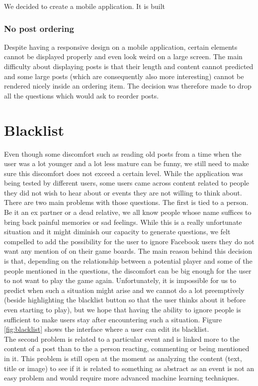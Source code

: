 We decided to create a mobile application. It is built


\subsubsection{No post ordering}
Despite having a responsive design on a mobile application, certain elements cannot be displayed properly and even look weird on a large screen. The main difficulty about displaying posts is that their length and content cannot predicted and some large posts (which are consequently also more interesting) cannot be rendered nicely inside an ordering item. The decision was therefore made to drop all the questions which would ask to reorder posts.
\section{Blacklist}
Even though some discomfort such as reading old posts from a time when the user was a lot younger and a lot less mature can be funny, we still need to make sure this discomfort does not exceed a certain level. While the application was being tested by different users, some users came across content related to people they did not wish to hear about or events they are not willing to think about.\\
There are two main problems with those questions. The first is tied to a person. Be it an ex partner or a dead relative, we all know people whose name suffices to bring back painful memories or sad feelings. While this is a really unfortunate situation and it might diminish our capacity to generate questions, we felt compelled to add the possibility for the user to ignore Facebook users they do not want any mention of on their game boards. The main reason behind this decision is that, depending on the relationship between a potential player and some of the people mentioned in the questions, the discomfort can be big enough for the user to not want to play the game again. Unfortunately, it is impossible for us to predict when such a situation might arise and we cannot do a lot preemptively (beside highlighting the blacklist button so that the user thinks about it before even starting to play), but we hope that having the ability to ignore people is sufficient to make users stay after encountering such a situation. Figure \ref{fig:blacklist} shows the interface where a user can edit its blacklist.\\
The second problem is related to a particular event and is linked more to the content of a post than to the a person reacting, commenting or being mentioned in it. This problem is still open at the moment as analyzing the content (text, title or image) to see if it is related to something as abstract as an event is not an easy problem and would require more advanced machine learning techniques.
